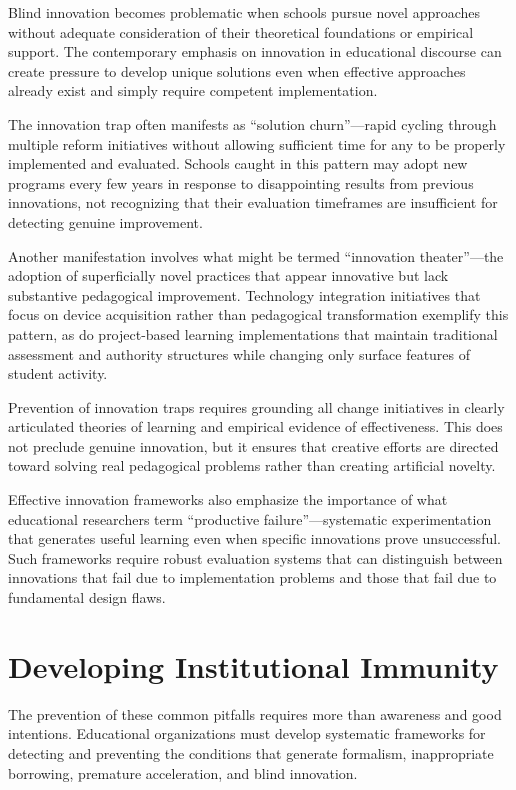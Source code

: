 \documentclass[
  Letterpaper,
]{scrbook}
\begin{document}
Blind innovation becomes problematic when schools pursue novel
approaches without adequate consideration of their theoretical
foundations or empirical support. The contemporary emphasis on
innovation in educational discourse can create pressure to develop
unique solutions even when effective approaches already exist and simply
require competent implementation.

The innovation trap often manifests as ``solution churn''---rapid
cycling through multiple reform initiatives without allowing sufficient
time for any to be properly implemented and evaluated. Schools caught in
this pattern may adopt new programs every few years in response to
disappointing results from previous innovations, not recognizing that
their evaluation timeframes are insufficient for detecting genuine
improvement.

Another manifestation involves what might be termed ``innovation
theater''---the adoption of superficially novel practices that appear
innovative but lack substantive pedagogical improvement. Technology
integration initiatives that focus on device acquisition rather than
pedagogical transformation exemplify this pattern, as do project-based
learning implementations that maintain traditional assessment and
authority structures while changing only surface features of student
activity.

Prevention of innovation traps requires grounding all change initiatives
in clearly articulated theories of learning and empirical evidence of
effectiveness. This does not preclude genuine innovation, but it ensures
that creative efforts are directed toward solving real pedagogical
problems rather than creating artificial novelty.

Effective innovation frameworks also emphasize the importance of what
educational researchers term ``productive failure''---systematic
experimentation that generates useful learning even when specific
innovations prove unsuccessful. Such frameworks require robust
evaluation systems that can distinguish between innovations that fail
due to implementation problems and those that fail due to fundamental
design flaws.

\section{Developing Institutional
Immunity}\label{developing-institutional-immunity}

The prevention of these common pitfalls requires more than awareness and
good intentions. Educational organizations must develop systematic
frameworks for detecting and preventing the conditions that generate
formalism, inappropriate borrowing, premature acceleration, and blind
innovation.
\end{document}
